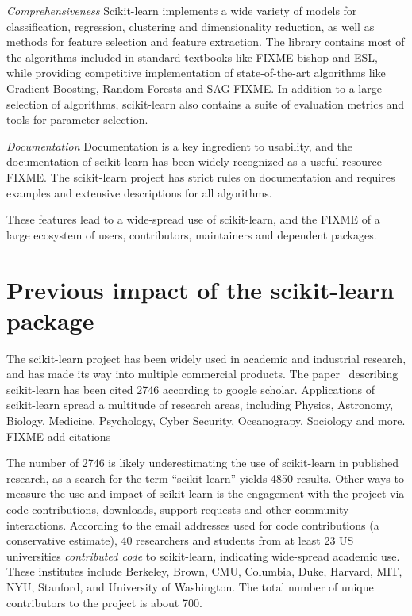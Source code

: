 \emph{Comprehensiveness} Scikit-learn implements a wide variety of models for classification,
regression, clustering and dimensionality reduction, as well as methods for feature
selection and feature extraction. The library contains most of the algorithms included
in standard textbooks like FIXME bishop and ESL, while providing competitive implementation
of state-of-the-art algorithms like Gradient Boosting, Random Forests and SAG FIXME\@.
In addition to a large selection of algorithms, scikit-learn also contains a suite
of evaluation metrics and tools for parameter selection.

\emph{Documentation}
Documentation is a key ingredient to usability, and the documentation of scikit-learn
has been widely recognized as a useful resource FIXME\@. The scikit-learn project
has strict rules on documentation and requires examples and extensive descriptions
for all algorithms.

These features lead to a wide-spread use of scikit-learn, and the FIXME of a large
ecosystem of users, contributors, maintainers and dependent packages.

\section{Previous impact of the scikit-learn package}
The scikit-learn project has been widely used in academic and industrial research,
and has made its way into multiple commercial products. The
paper~\cite{pedregosa2011scikit} describing scikit-learn has been cited 2746
according to google scholar. Applications of scikit-learn spread
a multitude of research areas, including Physics, Astronomy,
Biology, Medicine, Psychology, Cyber Security, Oceanograpy, Sociology and more. FIXME add citations

The number of 2746 is likely underestimating the use of scikit-learn in published research, as a search for the
term ``scikit-learn'' yields 4850 results.
Other ways to measure the use and impact of scikit-learn is the engagement with
the project via code contributions, downloads, support requests and other
community interactions.
According to the email addresses used for code contributions (a conservative
estimate), 40 researchers and students from at least 23 US universities
\emph{contributed code} to scikit-learn, indicating wide-spread academic use.
These institutes include Berkeley, Brown, CMU, Columbia, Duke, Harvard, MIT,
NYU, Stanford, and University of Washington.
The total number of unique contributors to the project is about 700.


